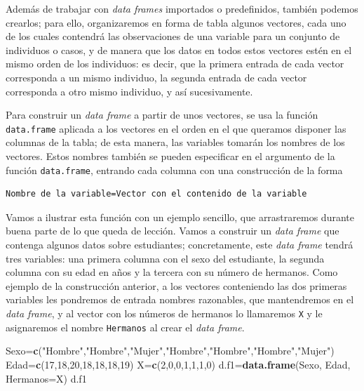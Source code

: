 \documentclass[]{book}
\newenvironment{Shaded}{\begin{snugshade}}{\end{snugshade}}
\newcommand{\DataTypeTok}[1]{\textcolor[rgb]{0.13,0.29,0.53}{#1}}
\newcommand{\DecValTok}[1]{\textcolor[rgb]{0.00,0.00,0.81}{#1}}
\newcommand{\KeywordTok}[1]{\textcolor[rgb]{0.13,0.29,0.53}{\textbf{#1}}}
\newcommand{\NormalTok}[1]{#1}
\newcommand{\StringTok}[1]{\textcolor[rgb]{0.31,0.60,0.02}{#1}}
\theoremstyle{definition}
\theoremstyle{definition}
\theoremstyle{definition}
\theoremstyle{remark}
\begin{document}
Además de trabajar con \emph{data frames} importados o predefinidos, también podemos crearlos; para ello, organizaremos en forma de tabla algunos vectores, cada uno de los cuales contendrá las observaciones de una variable para un conjunto de individuos o casos, y de manera que los datos en todos estos vectores estén en el mismo orden de los individuos: es decir, que la primera entrada de cada vector corresponda a un mismo individuo, la segunda entrada de cada vector corresponda a otro mismo individuo, y así sucesivamente.

Para construir un \emph{data frame} a partir de unos vectores, se usa la función \texttt{data.frame} aplicada a los vectores en el orden en el que queramos disponer las columnas de la tabla;
de esta manera, las variables tomarán los nombres de los vectores. Estos nombres también se pueden especificar en el argumento de la función \texttt{data.frame}, entrando cada columna con una construcción de la forma

\begin{verbatim}
Nombre de la variable=Vector con el contenido de la variable
\end{verbatim}

Vamos a ilustrar esta función con un ejemplo sencillo, que arrastraremos durante buena parte de lo que queda de lección. Vamos a construir un \emph{data frame} que contenga algunos datos sobre estudiantes; concretamente, este \emph{data frame} tendrá tres variables: una primera columna con el sexo del estudiante, la segunda columna con su edad en años y la tercera con su número de hermanos. Como ejemplo de la construcción anterior, a los vectores conteniendo las dos primeras variables les pondremos de entrada nombres razonables, que mantendremos en el \emph{data frame}, y al vector con los números de hermanos lo llamaremos \texttt{X} y le asignaremos el nombre \texttt{Hermanos} al crear el \emph{data frame}.

\begin{Shaded}
\begin{Highlighting}[]
\NormalTok{Sexo=}\KeywordTok{c}\NormalTok{(}\StringTok{"Hombre"}\NormalTok{,}\StringTok{"Hombre"}\NormalTok{,}\StringTok{"Mujer"}\NormalTok{,}\StringTok{"Hombre"}\NormalTok{,}\StringTok{"Hombre"}\NormalTok{,}\StringTok{"Hombre"}\NormalTok{,}\StringTok{"Mujer"}\NormalTok{)}
\NormalTok{Edad=}\KeywordTok{c}\NormalTok{(}\DecValTok{17}\NormalTok{,}\DecValTok{18}\NormalTok{,}\DecValTok{20}\NormalTok{,}\DecValTok{18}\NormalTok{,}\DecValTok{18}\NormalTok{,}\DecValTok{18}\NormalTok{,}\DecValTok{19}\NormalTok{)}
\NormalTok{X=}\KeywordTok{c}\NormalTok{(}\DecValTok{2}\NormalTok{,}\DecValTok{0}\NormalTok{,}\DecValTok{0}\NormalTok{,}\DecValTok{1}\NormalTok{,}\DecValTok{1}\NormalTok{,}\DecValTok{1}\NormalTok{,}\DecValTok{0}\NormalTok{)}
\NormalTok{d.f1=}\KeywordTok{data.frame}\NormalTok{(Sexo, Edad, }\DataTypeTok{Hermanos=}\NormalTok{X)}
\NormalTok{d.f1}
\end{Highlighting}
\end{Shaded}
\end{document}
